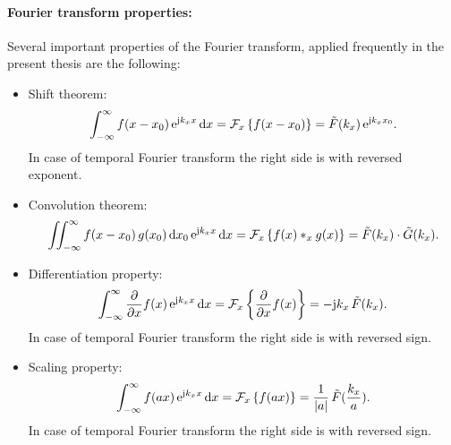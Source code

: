 \paragraph{Fourier transform properties:}
Several important properties of the Fourier transform, applied frequently in the present thesis are the following:
\begin{itemize}
\item Shift theorem:
\begin{equation}
\int_{-\infty}^{\infty} f(x-x_0) \, \te^{\ti k_x x} \, \td x = \FT[x]{ f(x-x_0) } = \tilde{F}(k_x) \, \te^{\ti k_x x_0}.
\end{equation}
In case of temporal Fourier transform the right side is with reversed exponent.
\item Convolution theorem:
\begin{equation}
\iint_{-\infty}^{\infty} f(x-x_0) \, g(x_0) \, \td x_0 \, \te^{\ti k_x x} \, \td x = \FT[x]{ f(x) \ast_x g(x) } = \tilde{F}(k_x) \cdot \tilde{G}(k_x).
\end{equation}
\item Differentiation property:
\begin{equation}
\int_{-\infty}^{\infty} \frac{\partial}{\partial x} f(x) \, \te^{\ti k_x x} \, \td x = \FT[x]{ \frac{\partial}{\partial x} f(x) } = 
-\ti k_x \, \tilde{F}(k_x).
\end{equation}
In case of temporal Fourier transform the right side is with reversed sign.
\item Scaling property:
\begin{equation}
\int_{-\infty}^{\infty} f(a x) \, \te^{\ti k_x x} \, \td x = \FT[x]{ f( a x ) } = 
\frac{1}{|a|} \, \tilde{F}(\frac{k_x}{a}).
\end{equation}
In case of temporal Fourier transform the right side is with reversed sign.
\end{itemize}

